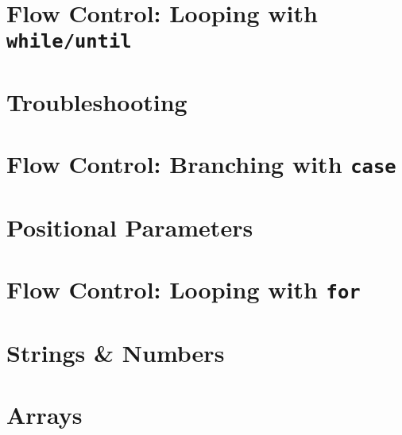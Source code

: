\documentclass[oneside]{book}
\numberwithin{equation}{section}
\begin{document}

\section{Flow Control: Looping with \texttt{while/until}}


\section{Troubleshooting}


\section{Flow Control: Branching with \texttt{case}}


\section{Positional Parameters}


\section{Flow Control: Looping with \texttt{for}}


\section{Strings \& Numbers}


\section{Arrays}

\end{document}
